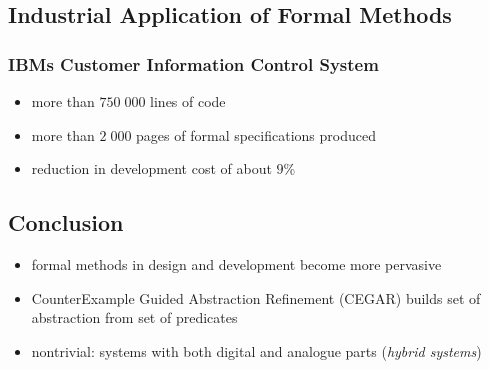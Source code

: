 \documentclass[a4paper, 10pt]{article}
\begin{document}
\subsection*{Industrial Application of Formal Methods}
\subsubsection*{IBMs Customer Information Control System}
\begin{itemize}
    \item more than $750\;000$ lines of code
    \item more than $2\;000$ pages of formal specifications produced
    \item reduction in development cost of about $9\%$
\end{itemize}

\subsection*{Conclusion}
\begin{itemize}
    \item formal methods in design and development become more pervasive
    \item CounterExample Guided Abstraction Refinement (CEGAR) builds set of abstraction from set of predicates
    \item nontrivial: systems with both digital and analogue parts (\emph{hybrid systems})
\end{itemize}
\end{document}
